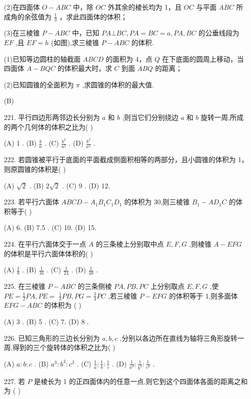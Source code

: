 \documentclass[10pt]{article}
\begin{document}
(2)在四面体 \(O - {ABC}\) 中，除 \({OC}\) 外其余的棱长均为 1，且 \({OC}\) 与平面 \({ABC}\) 所成角的余弦值为 \(\frac{1}{3}\) ，求此四面体的体积；

(3)在三棱锥 \(P - {ABC}\) 中，已知 \({PA}\bot {BC},{PA} = {BC} = a,{PA},{BC}\) 的公垂线段为 \({EF}\) ,且 \({EF} = h\) (如图),求三棱锥 \(P - {ABC}\) 的体积.

(1)已知等边圆柱的轴截面 \({ABCD}\) 的面积为 4，点 \(Q\) 在下底面的圆周上移动，当四面体 \(A - {BQC}\) 的体积最大时，求 \(C\) 到面 \({ABQ}\) 的距离；

(2)已知圆锥的全面积为 \(\pi\) ,求圆锥的体积的最大值.

(B)

221. 平行四边形两邻边长分别为 \(a\) 和 \(b\) ,则当它们分别绕边 \(a\) 和 \(b\) 旋转一周,所成的两个几何体的体积之比为( )

(A) 1 . (B) \(\frac{b}{a}\) . (C) \(\frac{{b}^{2}}{{a}^{2}}\) . (D) \(\frac{{b}^{3}}{{a}^{3}}\) .

222. 若圆锥被平行于底面的平面截成侧面积相等的两部分，且小圆锥的体积为 1，则原圆锥的体积是( )

(A) \(\sqrt{2}\) . (B) \(2\sqrt{2}\) . (C) 9 . (D) 12.

223. 若平行六面体 \({ABCD} - {A}_{1}{B}_{1}{C}_{1}{D}_{1}\) 的体积为 30,则三棱锥 \({B}_{1} - A{D}_{1}C\) 的体积等于( )

(A) 6. (B) 7.5 . (C) 10. (D) 15.

224. 在平行六面体交于一点 \(A\) 的三条棱上分别取中点 \(E,F,G\) ,则棱锥 \(A - {EFG}\) 的体积是平行六面体体积的( )

(A) \(\frac{1}{8}\) . (B) \(\frac{1}{16}\) . (C) \(\frac{1}{24}\) . (D) \(\frac{1}{48}\) .

225. 在三棱锥 \(P - {ABC}\) 的三条侧棱 \({PA},{PB},{PC}\) 上分别取点 \(E,F,G\) ,使 \({PE} = \frac{1}{2}{PA},{PE} = \; \frac{1}{3}{PB},{PG} = \frac{3}{4}{PC}\) ,若三棱锥 \(P - {EFG}\) 的体积等于 1,则多面体 \({EFG} - {ABC}\) 的体积为 ( )

(A) 3 . (B) 5 . (C) 7. (D) 8 .

226. 已知三角形的三边长分别为 \(a,b,c\) ,分别以各边所在直线为轴将三角形旋转一周,得到的三个旋转体的体积之比为( )

(A) \(a : b : c\) . (B) \({a}^{3} : {b}^{3} : {c}^{3}\) . (C) \(\frac{1}{a} : \frac{1}{b} : \frac{1}{c}\) . (D) \(\frac{1}{{a}^{3}} : \frac{1}{{b}^{3}} : \frac{1}{{c}^{3}}\) .

227. 若 \(P\) 是棱长为 1 的正四面体内的任意一点,则它到这个四面体各面的距离之和为 ( )
\end{document}
